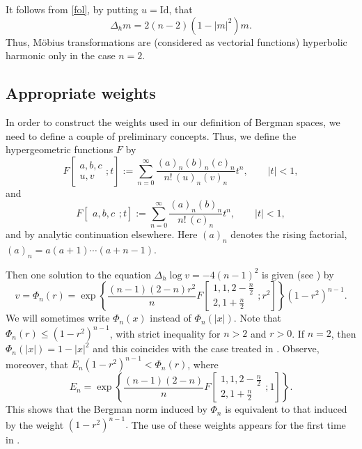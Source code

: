 \documentclass[a4paper,10pt]{amsart}
\begin{document}
It follows from \eqref{fol}, by putting $u=\mathrm{Id}$, that
\[
\Delta_h m=2 (n-2)(1-|m|^2)m.
\]
Thus, M\"obius transformations are (considered as vectorial functions) hyperbolic harmonic
only in the case $n=2$.

\subsection{Appropriate weights}
In order to construct the weights used in our definition of Bergman spaces, we need to define
a couple of preliminary concepts. Thus, we define the hypergeometric functions $F$ by
\[
F\!\left[\begin{array}{c}
a,b,c\\
u,v
\end{array};t\right]
:=\sum_{n=0}^{\infty}\frac{(a)_{n}(b)_{n}(c)_n}{n!\,(u)_n (v)_n}t^{n},
\qquad |t|<1,
\]
and
\[
F\!\left[\begin{array}{c}
a,b,c
\end{array};t\right]
:=\sum_{n=0}^{\infty}\frac{(a)_{n}(b)_{n}}{n!\,(c)_n }t^{n},
\qquad |t|<1,
\]
and by analytic continuation elsewhere. Here $(a)_n$ denotes the rising factorial,
$(a)_{n}=a(a+1)\cdots(a+n-1)$.

Then one solution to the equation $\Delta_h \log v= -4(n-1)^2$ is given
(see \cite[Proposition~6.1]{kalaj2024}) by
\begin{equation}\label{eq:Phi-n}
v=\Phi_n(r)
=\exp\!\left\{\frac{(n-1)(2-n) r^2}{ n}
F\!\left[\begin{array}{c}
1,1,2-\frac{n}{2}\\[2pt]
2,1+\frac{n}{2}
\end{array}; r^2\right]\right\}
(1-r^2)^{n-1}.
\end{equation}
We will sometimes write $\Phi_n(x)$ instead of $\Phi_n(|x|)$.
Note that $\Phi_n(r)\le (1-r^2)^{n-1}$, with strict inequality for $n>2$ and $r>0$.
If $n=2$, then $\Phi_n(|x|)=1-|x|^2$ and this coincides with the case treated in
\cite{RamosTilli}.
Observe, moreover, that $E_n (1-r^2)^{n-1} < \Phi_n(r)$, where
\[
E_n =\exp\!\left\{\frac{(n-1)(2-n)}{ n}
F\!\left[\begin{array}{c}
1,1,2-\frac{n}{2}\\[2pt]
2,1+\frac{n}{2}
\end{array}; 1 \right]\right\}.
\]
This shows that the Bergman norm induced by $\Phi_n$ is equivalent to that induced by
the weight $(1-r^2)^{n-1}.$ The use of these weights appears for the first time in
\cite{kalaj2024}.
\end{document}
